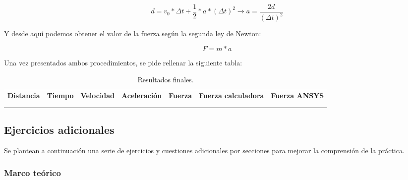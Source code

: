 \[d = v_0 * \Delta t + \frac{1}{2}*a*(\Delta t)^2 \rightarrow a = \frac{2d}{(\Delta t)^2}\]

Y desde aquí podemos obtener el valor de la fuerza según la segunda ley de Newton:

\[F=m*a\]

Una vez presentados ambos procedimientos, se pide rellenar la siguiente tabla:

\begin{table}[H]
    \centering
    \begin{adjustbox}{max width=\textwidth,center}
        \begin{tabular}{|c|c|c|c|c|c|c|}
        \hline
        \textbf{Distancia} & \textbf{Tiempo} & \textbf{Velocidad} & \textbf{Aceleración} & \textbf{Fuerza} & \textbf{Fuerza calculadora} & \textbf{Fuerza ANSYS} \\
          &  &  &  &  &  &  \\
          &  &  &  &  &  &  \\
        \hline
        \end{tabular}
    \end{adjustbox}
    \caption{Resultados finales.}
    \label{tab:resultadosFinales}
\end{table}


\subsection*{Ejercicios adicionales}

Se plantean a continuación una serie de ejercicios y cuestiones adicionales por secciones para mejorar la comprensión de la práctica.

\subsubsection*{Marco teórico}

